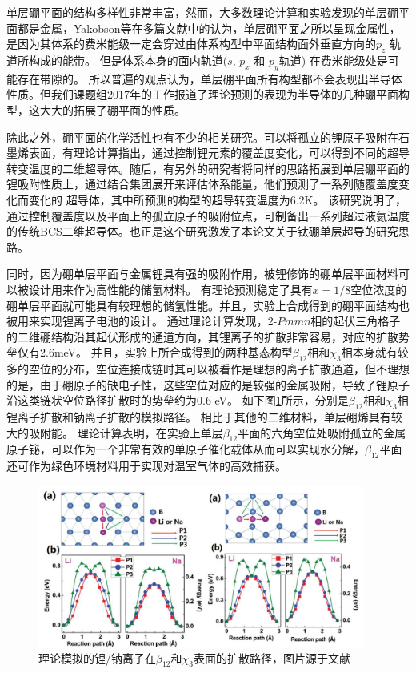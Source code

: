 单层硼平面的结构多样性非常丰富，然而，大多数理论计算和实验发现的单层硼平面都是金属\cite{zhang2017two}，Yakobson等\cite{penev2012polymorphism,penev2016can}在多篇文献中的认为，单层硼平面之所以呈现金属性，是因为其体系的费米能级一定会穿过由体系构型中平面结构面外垂直方向的$p_z$ 轨道所构成的能带。
但是体系本身的面内轨道($s$, $p_x$ 和 $p_y$轨道) 在费米能级处是可能存在带隙的。
所以普遍的观点认为，单层硼平面所有构型都不会表现出半导体性质。但我们课题组2017年的工作\cite{xu2017two}报道了理论预测的表现为半导体的几种硼平面构型，这大大的拓展了硼平面的性质。

除此之外，硼平面的化学活性也有不少的相关研究。可以将孤立的锂原子吸附在石墨烯表面，有理论计算指出\cite{profeta2012phonon}，通过控制锂元素的覆盖度变化，可以得到不同的超导转变温度的二维超导体。随后，有另外的研究者\cite{wu2016lithium}将同样的思路拓展到单层硼平面的锂吸附性质上，通过结合集团展开来评估体系能量，他们预测了一系列随覆盖度变化而变化的 超导体，其中所预测的构型的超导转变温度为6.2K。 该研究说明了，通过控制覆盖度以及平面上的孤立原子的吸附位点，可制备出一系列超过液氦温度的传统BCS二维超导体。也正是这个研究激发了本论文关于钛硼单层超导的研究思路。

同时，因为硼单层平面与金属锂具有强的吸附作用，被锂修饰的硼单层平面材料可以被设计用来作为高性能的储氢材料。
有理论\cite{li2015ultrahigh}预测稳定了具有$x=1/8$空位浓度的硼单层平面就可能具有较理想的储氢性能。并且，实验上合成得到的硼平面结构也被用来实现锂离子电池的设计。
通过理论计算\cite{jiang2016borophene}发现，2-$Pmmn$相的起伏三角格子的二维硼结构沿其起伏形成的通道方向，其锂离子的扩散非常容易，对应的扩散势垒仅有2.6meV。
并且，实验上所合成得到的两种基态构型$\beta_{12}$相和$\chi_3$相本身就有较多的空位的分布，空位连接成链时其可以被看作是理想的离子扩散通道\cite{zhang2016borophene}，但不理想的是，由于硼原子的缺电子性，这些空位对应的是较强的金属吸附，导致了锂原子沿这类链状空位路径扩散时的势垒约为0.6 eV。
如下图\ref{fig:ch1_lina_borophene}所示，分别是$\beta_{12}$相和$\chi_3$相锂离子扩散和钠离子扩散的模拟路径。
相比于其他的二维材料，单层硼烯具有较大的吸附能。
理论计算表明\cite{ling2017nanosheet}，在实验上单层$\beta_{12}$平面的六角空位处吸附孤立的金属原子铋，可以作为一个非常有效的单原子催化载体从而可以实现水分解，$\beta_{12}$平面还可作为绿色环境材料用于实现对温室气体的高效捕获\cite{tan2017borophene}。

\begin{figure}
  \includegraphics[width=0.96\textwidth]{figs/ch1_lina_borophene.png}
  \centering
  \caption{理论模拟的锂/钠离子在$\beta_{12}$和$\chi_3$表面的扩散路径，图片源于文献\cite{zhang2016borophene}}
  \label{fig:ch1_lina_borophene}
\end{figure}

